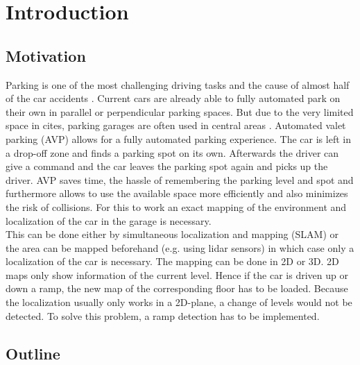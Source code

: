 \chapter{Introduction}
\label{ch:Introduction}

\section{Motivation}
Parking is one of the most challenging driving tasks and the cause of almost half of the car accidents \cite{accident}.
Current cars are already able to fully automated park on their own in parallel or perpendicular parking spaces.
But due to the very limited space in cites, parking garages are often used in central areas \cite{7995971}.
Automated valet parking (AVP) allows for a fully automated parking experience.
The car is left in a drop-off zone and finds a parking spot on its own.
 Afterwards the driver can give a command and the car leaves the parking spot again and picks up the driver.
 AVP saves time, the hassle of remembering the parking level and spot and furthermore allows to use the available space more efficiently and also minimizes the risk of collisions.
 For this to work an exact mapping of the environment and localization of the car in the garage is necessary.\\
This can be done either by simultaneous localization and mapping (SLAM) or the area can be mapped beforehand (e.g. using lidar sensors) in which case only a localization of the car is necessary.
The mapping can be done in 2D or 3D. 2D maps only show information of the current level. Hence if the car is driven up or down a ramp, the new map of the corresponding floor has to be loaded.
Because the localization usually only works in a 2D-plane, a change of levels would not be detected.
To solve this problem, a ramp detection has to be implemented.



\section{Outline}
